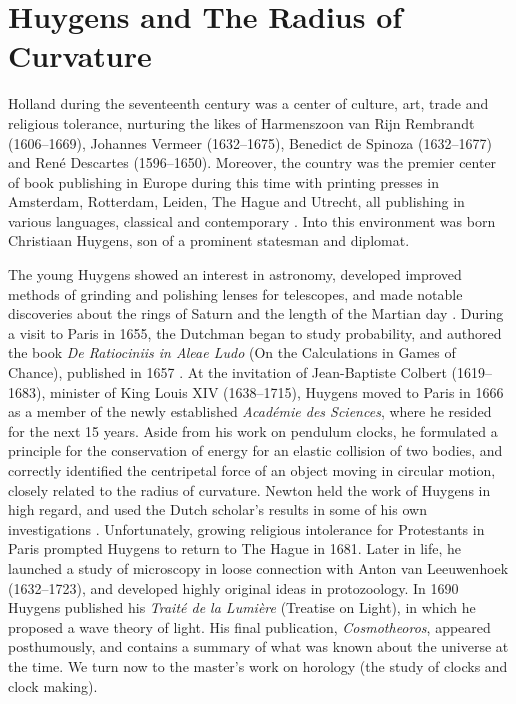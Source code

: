 \documentclass[12pt]{article}
\theoremstyle{definition}
\begin{document}
\section{Huygens and The Radius of Curvature}

Holland during the seventeenth century was a center of culture, art,
trade and religious tolerance, nurturing the likes of Harmenszoon van
Rijn Rembrandt (1606--1669), Johannes Vermeer (1632--1675), Benedict 
de Spinoza (1632--1677) and Ren\'e Descartes (1596--1650).  Moreover,
the country was the premier center of book publishing in Europe during
this time with printing presses in Amsterdam, Rotterdam, Leiden, The Hague and
Utrecht, all publishing in various languages, classical and
contemporary \cite[p.\ 88]{Hazard}.  Into this environment was born
Christiaan Huygens, son of a prominent statesman and diplomat.  

The young Huygens showed an interest in astronomy, developed improved
methods of grinding and polishing lenses for telescopes, and made
notable discoveries about the rings of Saturn and the length of the Martian day
\cite[p.\ 801]{Simmons}.  During a visit to Paris in 1655, the
Dutchman began to study probability, and authored the book {\em De
Ratiociniis in Aleae Ludo} (On the Calculations in Games of
Chance), published in 1657 \cite[p.\ 456]{Katz1998}.  At the invitation of
Jean-Baptiste Colbert (1619--1683), minister of King Louis XIV
(1638--1715), Huygens moved to Paris in 1666 as a member of the newly
established {\em Acad\'emie des Sciences}, where he resided for the
next 15 years.  Aside from his work on pendulum clocks, 
he formulated a principle for the conservation of energy for
an elastic collision of two bodies, and correctly identified the
centripetal force of an object moving in circular motion, closely
related to the radius of curvature.  Newton held
the work of Huygens in high regard, and used the Dutch scholar's
results in some of his own investigations \cite[p.\ 802]{Simmons}.
Unfortunately, growing religious intolerance for Protestants in
Paris prompted Huygens to return to The Hague in 1681.  
Later in life, he launched a study of microscopy in loose connection
with Anton van Leeuwenhoek (1632--1723), and developed highly original
ideas in protozoology.  In 1690 Huygens published his {\em Trait\'e de
la Lumi\`ere} (Treatise on Light), in which he proposed a wave theory
of light.  His final publication, {\em Cosmotheoros}, appeared
posthumously, and contains a summary of what was known about the
universe at the time.  We turn now to the master's work on horology
(the study of clocks and clock making).    
\end{document}

